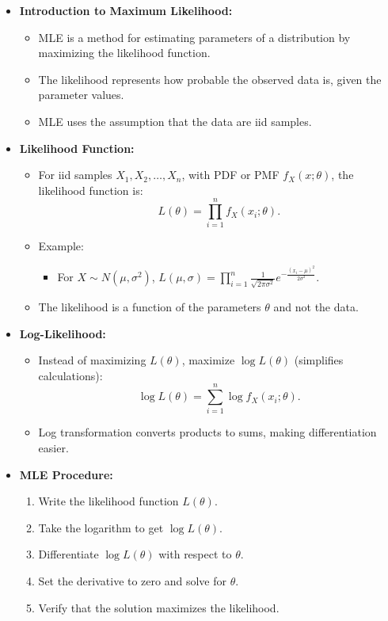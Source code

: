 \documentclass{article}
\begin{document}
\begin{itemize}
  \item \textbf{Introduction to Maximum Likelihood:}
    \begin{itemize}
      \item MLE is a method for estimating parameters of a distribution by maximizing the likelihood function.
      \item The likelihood represents how probable the observed data is, given the parameter values.
      \item MLE uses the assumption that the data are iid samples.
    \end{itemize}

  \item \textbf{Likelihood Function:}
    \begin{itemize}
      \item For iid samples $X_1, X_2, \dots, X_n$, with PDF or PMF $f_X(x; \theta)$, the likelihood function is:
        \[
          L(\theta) = \prod_{i=1}^n f_X(x_i; \theta).
        \]
      \item Example:
        \begin{itemize}
          \item For $X \sim N(\mu, \sigma^2)$, $L(\mu, \sigma) = \prod_{i=1}^n \frac{1}{\sqrt{2\pi\sigma^2}} e^{-\frac{(x_i-\mu)^2}{2\sigma^2}}$.
        \end{itemize}
      \item The likelihood is a function of the parameters $\theta$ and not the data.
    \end{itemize}

  \item \textbf{Log-Likelihood:}
    \begin{itemize}
      \item Instead of maximizing $L(\theta)$, maximize $\log L(\theta)$ (simplifies calculations):
        \[
          \log L(\theta) = \sum_{i=1}^n \log f_X(x_i; \theta).
        \]
      \item Log transformation converts products to sums, making differentiation easier.
    \end{itemize}

  \item \textbf{MLE Procedure:}
    \begin{enumerate}
      \item Write the likelihood function $L(\theta)$.
      \item Take the logarithm to get $\log L(\theta)$.
      \item Differentiate $\log L(\theta)$ with respect to $\theta$.
      \item Set the derivative to zero and solve for $\theta$.
      \item Verify that the solution maximizes the likelihood.
    \end{enumerate}


\end{itemize}
\end{document}

